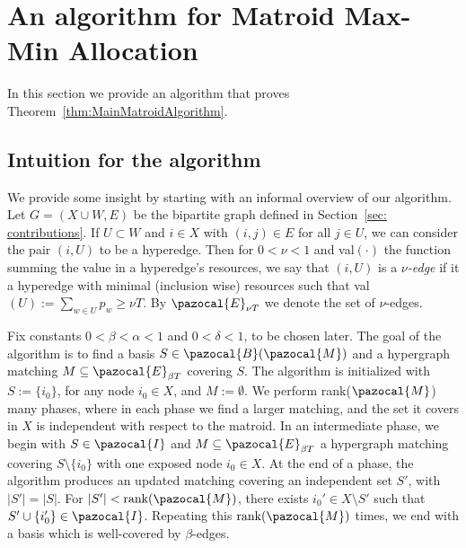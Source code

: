 \section{An algorithm for Matroid Max-Min Allocation}

In this section we provide an algorithm that proves 
Theorem~\ref{thm:MainMatroidAlgorithm}. 

\subsection{Intuition for the algorithm}

We provide some insight by starting with an informal overview of our algorithm.
Let $G = (X \cup W,E)$ be the bipartite graph defined in Section~\ref{sec: contributions}.
If $U \subset W$ and $i \in X$ with $(i,j) \in E$ for all $j \in U$, 
we can consider the pair $(i,U)$ to be a hyperedge.
Then for $0<\nu <1$ and val$(\cdot)$ the function summing the value in a hyperedge's resources,
we say that $(i,U)$ is a \emph{$\nu$-edge} if it a hyperedge with
minimal (inclusion wise) resources such that val$(U) := \sum_{w \in U} p_w \geq \nu T$.
By $\pazocal{E}_{\nu T}$ we denote the set of $\nu$-edges.

Fix constants $0< \beta<\alpha<1$ and $0<\delta < 1$, to be chosen later.
The goal of the algorithm is to find a basis $S \in \pazocal{B}(\pazocal{M})$
and a hypergraph matching $M \subseteq \pazocal{E}_{\beta T}$ covering $S$. 
The algorithm is initialized with $S := \{i_0\}$, for any node $i_0 \in X$,
and $M := \emptyset$. 
We perform rank($\pazocal{M}$) many phases, 
where in each phase we find a larger matching,
and the set it covers in $X$ is independent with respect to the matroid.
In an intermediate phase, we begin with
$S \in \pazocal{I}$ and $M \subseteq \pazocal{E}_{\beta T}$
a hypergraph matching covering $S \setminus \{ i_0\}$ with one exposed node $i_0 \in X$. 
At the end of a phase, the algorithm produces an updated matching covering an independent set $S'$, with $|S'|=|S|$.
For $|S'| < \textrm{rank}(\pazocal{M})$, there exists $i_0' \in X \setminus S'$ such that $S' \cup \{i_0'\} \in \pazocal{I}$.
 Repeating this $\text{rank}(\pazocal{M})$ times, we end with a basis which is well-covered by $\beta$-edges. 

